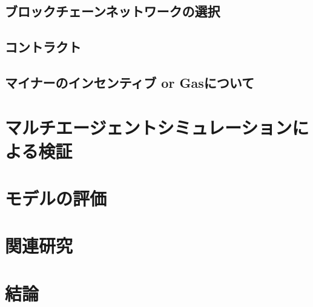 \documentclass[a4paper,11pt]{jlreq}
\begin{document}
\subsection{ブロックチェーンネットワークの選択}


\subsection{コントラクト}

\subsection{マイナーのインセンティブ or Gasについて}

\section{マルチエージェントシミュレーションによる検証}
\section{モデルの評価}
\section{関連研究}
\section{結論}



\end{document}
